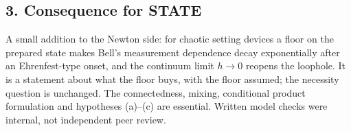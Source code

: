 \documentclass[11pt,a4paper]{article}
\begin{document}
\hypertarget{consequence-for-state}{%
\subsection{3. Consequence for STATE}\label{consequence-for-state}}

A small addition to the Newton side: for chaotic setting devices a floor
on the prepared state makes Bell's measurement dependence decay
exponentially after an Ehrenfest-type onset, and the continuum limit
\(h\to0\) reopens the loophole. It is a statement about what the floor
buys, with the floor assumed; the necessity question is unchanged. The
connectedness, mixing, conditional product formulation and hypotheses
(a)--(c) are essential. Written model checks were internal, not
independent peer review.
\end{document}
